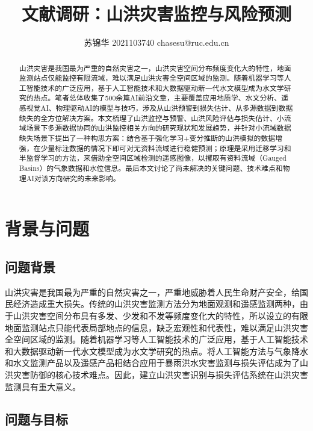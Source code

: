 \documentclass{ctexart}
\title{文献调研：山洪灾害监控与风险预测}
\begin{document}
\author{苏锦华 2021103740 chasesu@ruc.edu.cn}

\maketitle



\begin{abstract}
    
    山洪灾害是我国最为严重的自然灾害之一，山洪灾害空间分布频度变化大的特性，地面监测站点仅能监控有限流域，难以满足山洪灾害全空间区域的监测。随着机器学习等人工智能技术的广泛应用，基于人工智能技术和大数据驱动新一代水文模型成为水文学研究的热点。笔者总体收集了500余篇AI前沿文章，主要覆盖应用地质学、水文分析、遥感视觉AI、物理驱动AI的模型与技巧，涉及从山洪预警到损失估计、从多源数据到数据缺失的全方位解决方案。本文梳理了山洪监控与预警、山洪风险评估与损失估计、小流域场景下多源数据协同的山洪监控相关方向的研究现状和发展趋势，并针对小流域数据缺失场景下提出了一种构思方案：结合基于强化学习+变分推断的山洪模拟的数据增强，在少量标注数据的情况下即可对无资料流域进行稳健预测；原理是采用迁移学习和半监督学习的方法，来借助全空间区域检测的遥感图像，以攫取有资料流域（Gauged Basins）的气象数据和水位信息。最后本文讨论了尚未解决的关键问题、技术难点和物理AI对该方向研究的未来影响。

\end{abstract}

\section{背景与问题}

\subsection{问题背景}

山洪灾害是我国最为严重的自然灾害之一，严重地威胁着人民生命财产安全，给国民经济造成重大损失。传统的山洪灾害监测方法分为地面观测和遥感监测两种，由于山洪灾害空间分布具有多发、少发和不发等频度变化大的特性，所以设立的有限地面监测站点只能代表局部地点的信息，缺乏宏观性和代表性，难以满足山洪灾害全空间区域的监测。随着机器学习等人工智能技术的广泛应用，基于人工智能技术和大数据驱动新一代水文模型成为水文学研究的热点。将人工智能方法与气象降水和水文监测产品以及遥感产品相结合应用于暴雨洪水灾害监测与损失评估成为了山洪灾害防御的核心技术难点。因此，建立山洪灾害识别与损失评估系统在山洪灾害监测具有重大意义。


\subsection{问题与目标}
\end{document}
